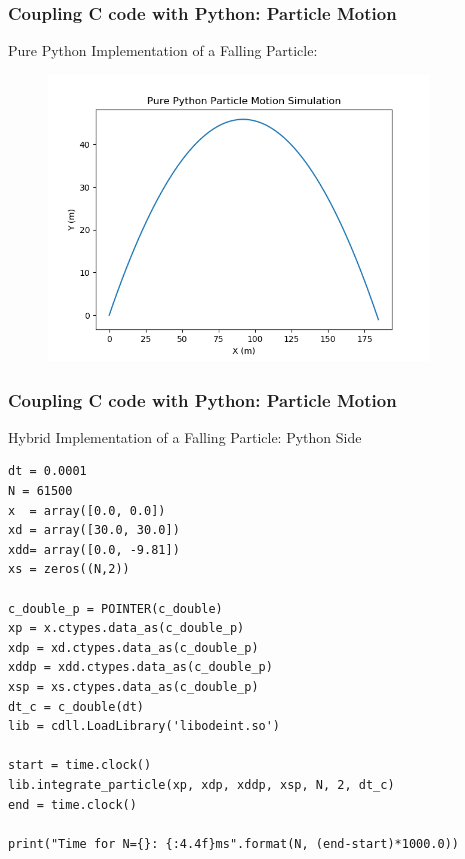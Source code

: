 \documentclass[landscape,10pt]{beamer}
\begin{document}
\begin{frame}[fragile]
\frametitle{Coupling C code with Python: Particle Motion}
Pure Python Implementation of a Falling Particle:

\begin{figure}[h]
    \tiny
    \centering
    \includegraphics[width=0.90\textwidth]{pyshot_particle.png}
\end{figure}
\end{frame}

\begin{frame}[fragile]
\frametitle{Coupling C code with Python: Particle Motion}
Hybrid Implementation of a Falling Particle: Python Side
\begin{scriptsize}
\begin{lstlisting}
dt = 0.0001
N = 61500
x  = array([0.0, 0.0])
xd = array([30.0, 30.0])
xdd= array([0.0, -9.81])
xs = zeros((N,2))

c_double_p = POINTER(c_double)
xp = x.ctypes.data_as(c_double_p)
xdp = xd.ctypes.data_as(c_double_p)
xddp = xdd.ctypes.data_as(c_double_p)
xsp = xs.ctypes.data_as(c_double_p)
dt_c = c_double(dt)
lib = cdll.LoadLibrary('libodeint.so')

start = time.clock()
lib.integrate_particle(xp, xdp, xddp, xsp, N, 2, dt_c)
end = time.clock()

print("Time for N={}: {:4.4f}ms".format(N, (end-start)*1000.0))
\end{lstlisting}
\end{scriptsize}

\end{frame}
\end{document}
